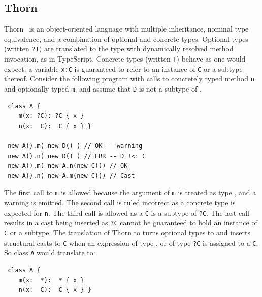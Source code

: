 \documentclass[acmlarge, anonymous, authordraft]{acmart}
\newcommand{\code}[1]{{\tt #1}\xspace}
\begin{document}
\subsection{Thorn}

Thorn~\cite{oopsla09} is an object-oriented language with multiple inheritance,
nominal type equivalence, and a combination of optional and concrete types.
Optional types (written \code{?T}) are translated to the \any type with
dynamically resolved method invocation, as in TypeScript. Concrete types
(written \code{T}) behave as one would expect: a variable \code{x:C} is
guaranteed to refer to an instance of \code C or a subtype thereof. Consider the
following program with calls to concretely typed method \code n and optionally
typed \code m, and assume that \code D is not a subtype of \C.

\begin{lstlisting}
 class A {
    m(x: ?C): ?C { x }
    n(x:  C):  C { x } }

 new A().m( new D() ) // OK -- warning
 new A().n( new D() ) // ERR -- D !<: C
 new A().m( new A.n(new C()) // OK
 new A().n( new A.m(new C()) // Cast
\end{lstlisting}

\noindent The first call to \code m is allowed because the argument of \code m
is treated as type \any, and a warning is emitted. The second call is ruled
incorrect as a concrete type is expected for \code n. The third call is allowed
as a \code C is a subtype of \code{?C}. The last call results in a cast being
inserted as \code{?C} cannot be guaranteed to hold an instance of \code{C} or a
subtype.  The translation of Thorn to \kafka turns optional types to \any and
inserts structural casts to \code{C} when an expression of type \any, or of type
\code{?C} is assigned to a \code{C}. So class \code A would translate to:

\begin{lstlisting}
 class A {
    m(x:  *):  * { x }
    n(x:  C):  C { x } }
\end{lstlisting}
\end{document}
